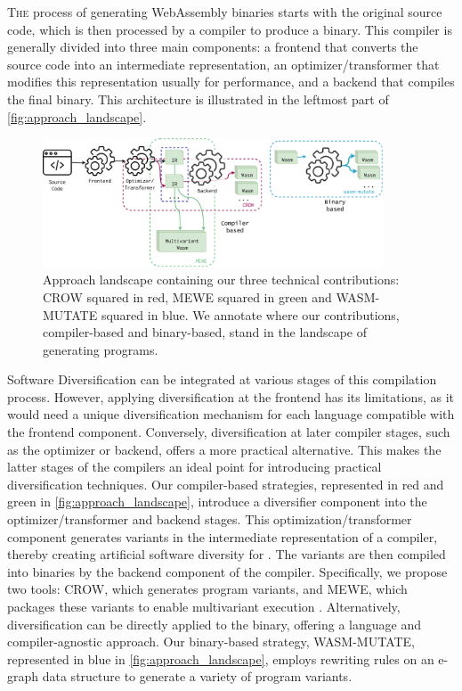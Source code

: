
\lettrine[lines=3]{T}{he} process of generating WebAssembly binaries starts with the original source code, which is then processed by a compiler to produce a \Wasm binary. 
This compiler is generally divided into three main components: a frontend that converts the source code into an intermediate representation, an optimizer/transformer that modifies this representation usually for performance, and a backend that compiles the final \Wasm binary.
This architecture is illustrated in the leftmost part of \autoref{fig:approach_landscape}.

\begin{figure}[h]
	\centering
	\includegraphics[width=0.9\textwidth]{figures/landscape.pdf}
	\caption{Approach landscape containing our three technical contributions: CROW squared in red, MEWE squared in green and WASM-MUTATE squared in blue. We annotate where our contributions, compiler-based and binary-based, stand in the landscape of generating \Wasm programs.}
	\label{fig:approach_landscape}
\end{figure}

Software Diversification can be integrated at various stages of this compilation process. 
However, applying diversification at the frontend has its limitations, as it would need a unique diversification mechanism for each language compatible with the frontend component. 
Conversely, diversification at later compiler stages, such as the optimizer or backend, offers a more practical alternative.
This makes the latter stages of the compilers an ideal point for introducing practical \wasm diversification techniques.
Our compiler-based strategies, represented in red and green in \autoref{fig:approach_landscape}, introduce a diversifier component into the optimizer/transformer and backend stages. 
This optimization/transformer component generates variants in the intermediate representation of a compiler, thereby creating artificial software diversity for \Wasm. 
The variants are then compiled into \Wasm binaries by the backend component of the compiler.
Specifically, we propose two tools: CROW, which generates \Wasm program variants, and MEWE, which packages these variants to enable multivariant execution \cite{cox06}.
Alternatively, diversification can be directly applied to the \Wasm binary, offering a language and compiler-agnostic approach. 
Our binary-based strategy, WASM-MUTATE, represented in blue in \autoref{fig:approach_landscape}, employs rewriting rules on an e-graph data structure to generate a variety of \Wasm program variants.

